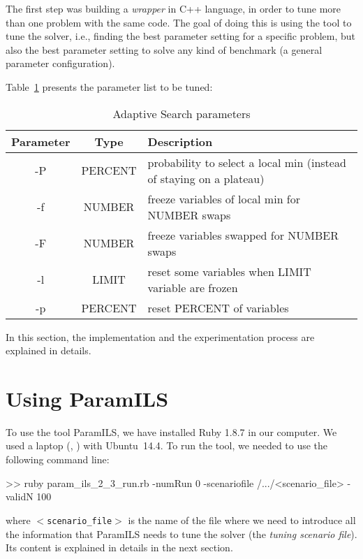 The first step was building a {\it wrapper} in C++ language, in order to tune more than one problem with the same code. The goal of doing this is using the tool to tune the solver, i.e., finding the best parameter setting for a specific problem, but also the best parameter setting to solve any kind of benchmark (a general parameter configuration).

\nocite{Rickard}

Table~\ref{table:param} presents the parameter list to be tuned:

\begin{table}[ht] 
\centering 
\begin{tabular}{c c l}
\hline\hline
Parameter & Type & Description \\ [0.5ex]
\hline
-P & PERCENT & probability to select a local min (instead of staying on a plateau) \\
-f & NUMBER & freeze variables of local min for NUMBER swaps \\ 
-F & NUMBER & freeze variables swapped for NUMBER swaps \\ 
-l & LIMIT & reset some variables when LIMIT variable are frozen \\ 
-p & PERCENT & reset PERCENT of variables \\ [1ex]
\hline
\end{tabular} 
\caption{Adaptive Search parameters}
\label{table:param}
\end{table} 

In this section, the implementation and the experimentation process are explained in details.

\section{Using ParamILS}

To use the tool {\sc ParamILS}, we have installed Ruby 1.8.7 in our computer. We used a laptop \mylaptopName (\mylaptopProc, \mylaptopMemo) with {\sc Ubuntu~14.4}. To run the tool, we needed to use the following command line:

\begin{BGVerbatim}
>> ruby param_ils_2_3_run.rb -numRun 0 -scenariofile /.../<scenario_file> -validN 100
\end{BGVerbatim}

where \texttt{$<$scenario\_file$>$} is the name of the file where we need to introduce all the information that {\sc ParamILS} needs to tune the solver (the \textit{tuning scenario file}). Its content is explained in details in the next section.

